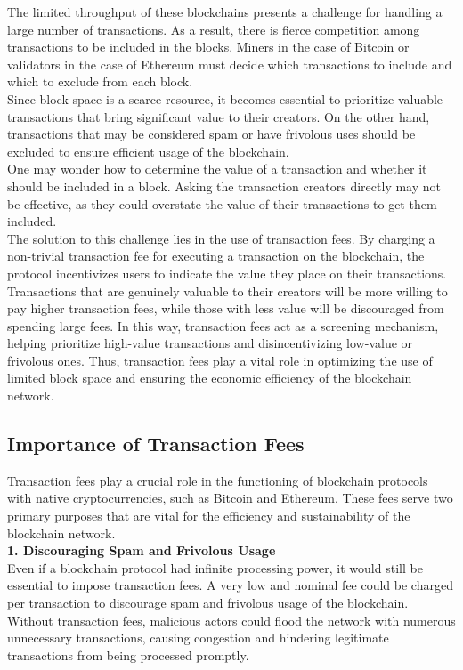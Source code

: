 The limited throughput of these blockchains presents a challenge for handling a large number of transactions. As a result, there is fierce competition among transactions to be included in the blocks. Miners in the case of Bitcoin or validators in the case of Ethereum must decide which transactions to include and which to exclude from each block.\\

Since block space is a scarce resource, it becomes essential to prioritize valuable transactions that bring significant value to their creators. On the other hand, transactions that may be considered spam or have frivolous uses should be excluded to ensure efficient usage of the blockchain.\\

One may wonder how to determine the value of a transaction and whether it should be included in a block. Asking the transaction creators directly may not be effective, as they could overstate the value of their transactions to get them included.\\

The solution to this challenge lies in the use of transaction fees. By charging a non-trivial transaction fee for executing a transaction on the blockchain, the protocol incentivizes users to indicate the value they place on their transactions. Transactions that are genuinely valuable to their creators will be more willing to pay higher transaction fees, while those with less value will be discouraged from spending large fees. In this way, transaction fees act as a screening mechanism, helping prioritize high-value transactions and disincentivizing low-value or frivolous ones. Thus, transaction fees play a vital role in optimizing the use of limited block space and ensuring the economic efficiency of the blockchain network.

\subsection{Importance of Transaction Fees}
Transaction fees play a crucial role in the functioning of blockchain protocols with native cryptocurrencies, such as Bitcoin and Ethereum. These fees serve two primary purposes that are vital for the efficiency and sustainability of the blockchain network.\\

\noindent
\textbf{1. Discouraging Spam and Frivolous Usage}\\
Even if a blockchain protocol had infinite processing power, it would still be essential to impose transaction fees. A very low and nominal fee could be charged per transaction to discourage spam and frivolous usage of the blockchain. Without transaction fees, malicious actors could flood the network with numerous unnecessary transactions, causing congestion and hindering legitimate transactions from being processed promptly.\\

